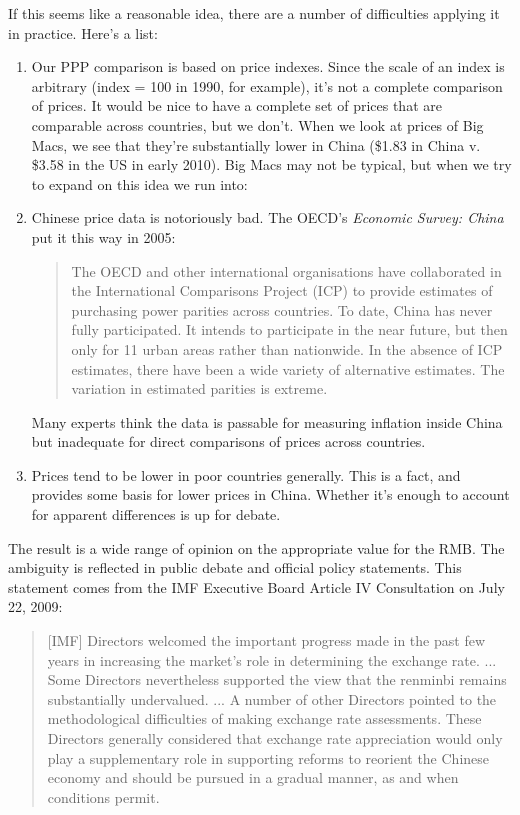 \documentclass[letterpaper,12pt]{article}
\begin{document}
If this seems like a reasonable idea, 
there are a number of difficulties applying it in practice.  
Here's a list:   
%
\begin{enumerate}

\item Our PPP comparison is based on price indexes.
Since the scale of an index is arbitrary 
(index = 100 in 1990, for example), 
it's not a complete comparison of prices.
It would be nice to have a complete set of prices
that are comparable across countries, but we don't. 
When we look at prices of Big Macs, 
we see that they're substantially lower
in China (\$1.83 in China v. \$3.58 in the US in early 2010).  
Big Macs may not be typical, but when we try to expand 
on this idea  we run into:  

\item Chinese price data is notoriously bad.  
The OECD's {\it Economic Survey:  China\/} put it this way in 2005:
%
\begin{quote}
The OECD and other international organisations have collaborated
in the International Comparisons Project (ICP) to provide
estimates of purchasing power parities across countries.
To date, China has never fully participated.
It intends to participate in the near future, but then only for 11 urban areas
rather than nationwide.  
In the absence of ICP estimates, there have been a wide variety of 
alternative estimates.  
The variation in estimated parities is extreme.  
\end{quote}
%
Many experts think the data is passable for measuring inflation
inside China but inadequate for direct comparisons 
of prices across countries.  

\item Prices tend to be lower in poor countries generally. 
This is a fact, and provides some basis for lower prices in China.
Whether it's enough to account for apparent differences is up for debate.  

\end{enumerate} 

The result is a wide range of opinion 
on the appropriate value for the RMB.  
The ambiguity is reflected in public debate and official policy statements.  
This statement comes from the IMF Executive Board Article IV Consultation  
on July 22, 2009:  

\begin{quote}
[IMF] Directors welcomed the important progress made in the past few years in increasing the market's role in determining the exchange rate. ...
Some Directors nevertheless supported the view that the renminbi remains substantially undervalued. ... A number of other Directors pointed to the methodological difficulties of making exchange rate assessments.  These Directors generally considered that exchange rate appreciation would only play a supplementary role in supporting reforms to reorient the Chinese economy and should be pursued in a gradual manner, as and when conditions permit.
\end{quote} 
\end{document}
